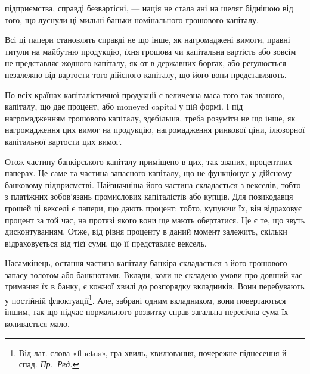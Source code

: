 \parcont{}  %
підприємства, справді безвартісні, — нація не стала ані на шеляг біднішою
від того, що луснули ці мильні баньки номінального грошового капіталу.

Всі ці папери становлять справді не що інше, як нагромаджені вимоги,
правні титули на майбутню продукцію, їхня грошова чи капітальна вартість
або зовсім не представляє жодного капіталу, як от в державних боргах, або
реґулюється незалежно від вартости того дійсного капіталу, що його вони представляють.

По всіх країнах капіталістичної продукції є величезна маса того так званого,
капіталу, що дає процент, або moneyed capital у цій формі. І під нагромадженням
грошового капіталу, здебільша, треба розуміти не що інше, як нагромадження
цих вимог на продукцію, нагромадження ринкової ціни, ілюзорної
капітальної вартости цих вимог.

Отож частину банкірського капіталу приміщено в цих, так званих, процентних
паперах. Це саме та частина запасного капіталу, що не функціонує
у дійсному банковому підприємстві. Найзначніша його частина складається з
векселів, тобто з платіжних зобов’язань промислових капіталістів або купців.
Для позикодавця грошей ці векселі є папери, що дають процент; тобто, купуючи
їх, він відраховує процент за той час, на протязі якого вони ще мають обертатися.
Це є те, що звуть дисконтуванням. Отже, від рівня проценту в даний момент
залежить, скільки відраховується від тієї суми, що її представляє вексель.

Насамкінець, остання частина капіталу банкіра складається з його грошового
запасу золотом або банкнотами. Вклади, коли не складено умови про
довший час тримання їх в банку, є кожної хвилі до розпорядку вкладників.
Вони перебувають у постійній флюктуації\footnote*{
Від лат. слова «fluctus», гра хвиль, хвилювання, почережне піднесення й спад. \emph{Пр.~Ред.}
}. Але, забрані одним вкладником, вони
повертаються іншим, так що підчас нормального розвитку справ загальна пересічна
сума їх коливається мало.

